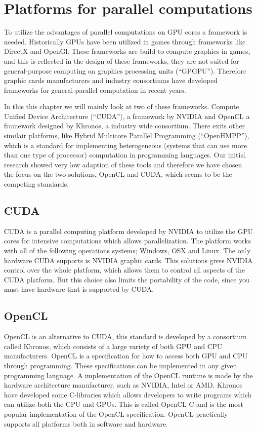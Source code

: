 \section{Platforms for parallel computations}
To utilize the advantages of parallel computations on GPU cores a framework is needed.
Historically GPUs have been utilized in games through frameworks like DirectX and OpenGl.
These frameworks are build to compute graphics in games, and this is reflected in the design of these frameworks, they are not suited for general-purpose computing on graphics processing units (``GPGPU'').
Therefore graphic cards manufacturers and industry consortiums have developed frameworks for general parallel computation in recent years.

In this this chapter we will mainly look at two of these frameworks.
Compute Unified Device Architecture (``CUDA''), a framework by NVIDIA and OpenCL a framework designed by Khronos, a industry wide consortium.\citep{CUDA, OpenCL}
There exits other similair platforms, like Hybrid Multicore Parallel Programming (``OpenHMPP''), which is a standard for implementing heterogeneous (systems that can use more than one type of processor) computation in programming languages. 
Our initial research showed very low adaption of these tools and therefore we have chosen the focus on the two solutions, OpenCL and CUDA, which seems to be the competing standards. 

\subsection{CUDA}\label{sec:opencl}
CUDA is a parallel computing platform developed by NVIDIA to utilize the GPU cores for intensive computations which allows parallelization.
The platform works with all of the following operations systems; Windows, OSX and Linux.
The only hardware CUDA supports is NVIDIA graphic cards. 
This solutions gives NVIDIA control over the whole platform, which allows them to control all aspects of the CUDA platform.
But this choice also limits the portability of the code, since you must have hardware that is supported by CUDA. \citep{CUDAfaq}

\subsection{OpenCL}
OpenCL is an alternative to CUDA, this standard is developed by a consortium called Khronos, which consists of a large variety of both GPU and CPU manufacturers.
OpenCL is a specification for how to access both GPU and CPU through programming.
These specifications can be implemented in any given programming language.
A implementation of the OpenCL runtime is made by the hardware architecture manufacturer, such as NVIDIA, Intel or AMD. 
Khronos have developed some C-libraries which allows developers to write programs which can utilize both the CPU and GPUs.
This is called OpenCL C and is the most popular implementation of the OpenCL specification.
OpenCL practically supports all platforms both in software and hardware. 

